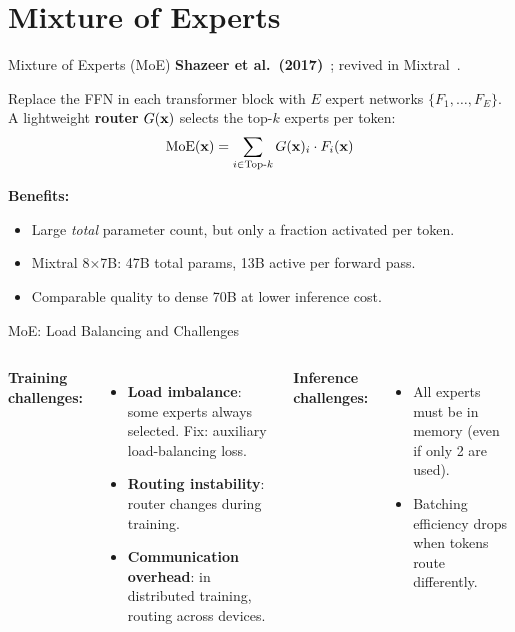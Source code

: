 \documentclass[aspectratio=169,10pt]{beamer}
\begin{document}
\section{Mixture of Experts}

\begin{frame}{Mixture of Experts (MoE)}
  \textbf{Shazeer et al.\ (2017)}~\cite{shazeer2017moe}; revived in Mixtral~\cite{jiang2024mixtral}.
  \vspace{0.4em}
  \begin{tcolorbox}[hitbox, title=MoE Layer]
    Replace the FFN in each transformer block with $E$ expert networks $\{F_1,\ldots,F_E\}$.
    A lightweight \textbf{router} $G(\mathbf{x})$ selects the top-$k$ experts per token:
    \[
      \text{MoE}(\mathbf{x}) = \sum_{i \in \text{Top-}k} G(\mathbf{x})_i \cdot F_i(\mathbf{x})
    \]
  \end{tcolorbox}
  \vspace{0.4em}
  \textbf{Benefits:}
  \begin{itemize}
    \item Large \emph{total} parameter count, but only a fraction activated per token.
    \item Mixtral 8×7B: 47B total params, 13B active per forward pass.
    \item Comparable quality to dense 70B at lower inference cost.
  \end{itemize}
\end{frame}

\begin{frame}{MoE: Load Balancing and Challenges}
  \begin{columns}[T]
      \textbf{Training challenges:}
      \begin{itemize}
        \item \textbf{Load imbalance}: some experts always selected.
          Fix: auxiliary load-balancing loss.
        \item \textbf{Routing instability}: router changes during training.
        \item \textbf{Communication overhead}: in distributed training, routing across devices.
      \end{itemize}
      \vspace{0.4em}
      \textbf{Inference challenges:}
      \begin{itemize}
        \item All experts must be in memory (even if only 2 are used).
        \item Batching efficiency drops when tokens route differently.
      \end{itemize}
  \end{columns}
\end{frame}
\end{document}
